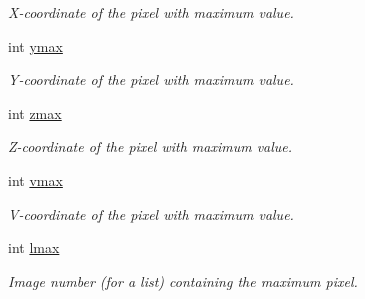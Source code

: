 \begin{DoxyCompactItemize}
\begin{DoxyCompactList}\small\item\em X-\/coordinate of the pixel with maximum value. \item\end{DoxyCompactList}\item 
\hypertarget{structcimg__library_1_1_c_img_stats_a5e6a1e7b39bc13798bb3ef23dd17a5fa}{
int \hyperlink{structcimg__library_1_1_c_img_stats_a5e6a1e7b39bc13798bb3ef23dd17a5fa}{ymax}}
\label{structcimg__library_1_1_c_img_stats_a5e6a1e7b39bc13798bb3ef23dd17a5fa}

\begin{DoxyCompactList}\small\item\em Y-\/coordinate of the pixel with maximum value. \item\end{DoxyCompactList}\item 
\hypertarget{structcimg__library_1_1_c_img_stats_acca3ac56991475445b68d6c6d5f252e6}{
int \hyperlink{structcimg__library_1_1_c_img_stats_acca3ac56991475445b68d6c6d5f252e6}{zmax}}
\label{structcimg__library_1_1_c_img_stats_acca3ac56991475445b68d6c6d5f252e6}

\begin{DoxyCompactList}\small\item\em Z-\/coordinate of the pixel with maximum value. \item\end{DoxyCompactList}\item 
\hypertarget{structcimg__library_1_1_c_img_stats_ae194d7a61fecbb51c5897f9542f988ed}{
int \hyperlink{structcimg__library_1_1_c_img_stats_ae194d7a61fecbb51c5897f9542f988ed}{vmax}}
\label{structcimg__library_1_1_c_img_stats_ae194d7a61fecbb51c5897f9542f988ed}

\begin{DoxyCompactList}\small\item\em V-\/coordinate of the pixel with maximum value. \item\end{DoxyCompactList}\item 
\hypertarget{structcimg__library_1_1_c_img_stats_a7bd17a1b6df26fe1c0e7ae99ce5f9dfa}{
int \hyperlink{structcimg__library_1_1_c_img_stats_a7bd17a1b6df26fe1c0e7ae99ce5f9dfa}{lmax}}
\label{structcimg__library_1_1_c_img_stats_a7bd17a1b6df26fe1c0e7ae99ce5f9dfa}

\begin{DoxyCompactList}\small\item\em Image number (for a list) containing the maximum pixel. \item\end{DoxyCompactList}\end{DoxyCompactItemize}


